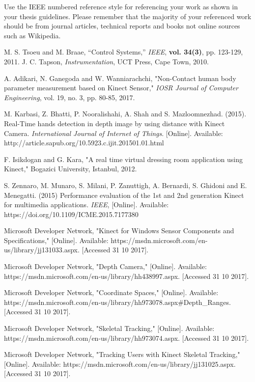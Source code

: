 Use the IEEE numbered reference style for referencing your work as shown in your thesis guidelines.
Please remember that the majority of your referenced work should be from journal articles, technical
reports and books not online sources such as Wikipedia.

\begin{thebibliography}{5}
 M. S. Tsoeu and M. Braae, ``Control Systems,'' \emph{IEEE}, {\bf vol. 34(3)}, pp. 123-129, 2011.
 J. C. Tapson, \emph{Instrumentation}, UCT Press, Cape Town, 2010.

 A. Adikari, N. Ganegoda and W. Wanniarachchi, "Non-Contact human body parameter measurement based on Kinect Sensor," \emph{IOSR Journal of Computer Engineering}, vol. 19, no. 3, pp. 80-85, 2017. 

 M. Karbasi, Z. Bhatti, P. Nooralishahi, A. Shah and S. Mazloomnezhad. (2015). Real-Time hands detection in depth image by using distance with Kinect Camera. \emph{International Journal of Internet of Things}. [Online]. Available: http://article.sapub.org/10.5923.c.ijit.201501.01.html

 F. Isikdogan and G. Kara, "A real time virtual dressing room application using Kinect," Bogazici University, Istanbul, 2012.

 S. Zennaro, M. Munaro, S. Milani, P. Zanuttigh, A. Bernardi, S. Ghidoni and E. Menegatti. (2015) Performance evaluation of the 1st and 2nd generation Kinect for multimedia applications. \emph{IEEE}, [Online]. Available: https://doi.org/10.1109/ICME.2015.7177380

 Microsoft Developer Network, "Kinect for Windows Sensor Components and Specifications," [Online]. Available: https://msdn.microsoft.com/en-us/library/jj131033.aspx. [Accessed 31 10 2017].

 Microsoft Developer Network, "Depth Camera," [Online]. Available: https://msdn.microsoft.com/en-us/library/hh438997.aspx. [Accessed 31 10 2017].

 Microsoft Developer Network, "Coordinate Spaces," [Online]. Available: https://msdn.microsoft.com/en-us/library/hh973078.aspx\#Depth\_Ranges. [Accessed 31 10 2017].

 Microsoft Developer Network, "Skeletal Tracking," [Online]. Available: https://msdn.microsoft.com/en-us/library/hh973074.aspx. [Accessed 31 10 2017].

 Microsoft Developer Network, "Tracking Users with Kinect Skeletal Tracking," [Online]. Available: https://msdn.microsoft.com/en-us/library/jj131025.aspx. [Accessed 31 10 2017].
\end{thebibliography}
